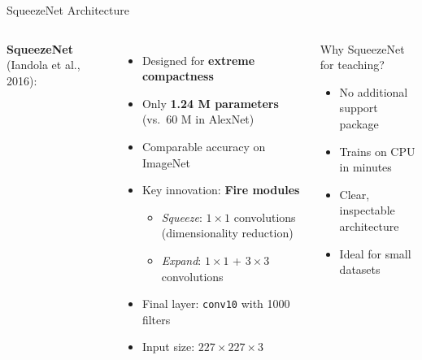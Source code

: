 \documentclass[aspectratio=169,xcolor=dvipsnames]{beamer}
\begin{document}
\begin{frame}{SqueezeNet Architecture}
    \begin{columns}
        \textbf{SqueezeNet} (Iandola et al., 2016):
        \begin{itemize}
            \item Designed for \textbf{extreme compactness}
            \item Only \textbf{1.24 M parameters} (vs.\ 60 M in AlexNet)
            \item Comparable accuracy on ImageNet
            \item Key innovation: \textbf{Fire modules}
                \begin{itemize}
                    \item \textit{Squeeze}: $1\times1$ convolutions (dimensionality reduction)
                    \item \textit{Expand}: $1\times1$ + $3\times3$ convolutions
                \end{itemize}
            \item Final layer: \texttt{conv10} with 1000 filters
            \item Input size: $227 \times 227 \times 3$
        \end{itemize}
        \begin{block}{Why SqueezeNet for teaching?}
            \begin{itemize}
                \item No additional support package
                \item Trains on CPU in minutes
                \item Clear, inspectable architecture
                \item Ideal for small datasets
            \end{itemize}
        \end{block}
    \end{columns}
\end{frame}
\end{document}
